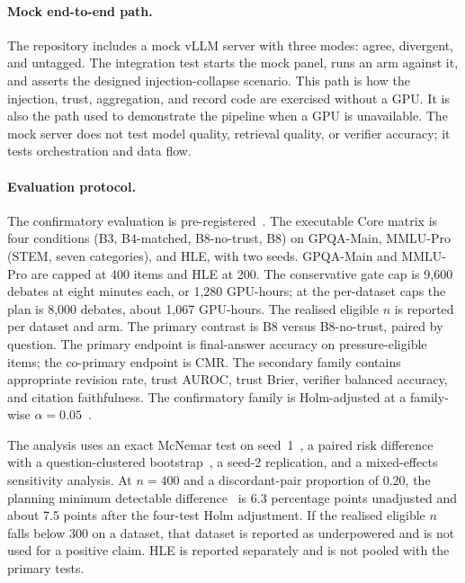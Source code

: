 \paragraph*{Mock end-to-end path.}
The repository includes a mock vLLM server with three modes: agree, divergent, and untagged. The integration test starts the mock panel, runs an arm against it, and asserts the designed injection-collapse scenario. This path is how the injection, trust, aggregation, and record code are exercised without a GPU. It is also the path used to demonstrate the pipeline when a GPU is unavailable. The mock server does not test model quality, retrieval quality, or verifier accuracy; it tests orchestration and data flow.

\paragraph*{Evaluation protocol.}
The confirmatory evaluation is pre-registered~\cite{nosek2018preregistration}. The executable Core matrix is four conditions (B3, B4-matched, B8-no-trust, B8) on GPQA-Main, MMLU-Pro (STEM, seven categories), and HLE, with two seeds. GPQA-Main and MMLU-Pro are capped at 400 items and HLE at 200. The conservative gate cap is 9{,}600 debates at eight minutes each, or 1{,}280 GPU-hours; at the per-dataset caps the plan is 8{,}000 debates, about 1{,}067 GPU-hours. The realised eligible $n$ is reported per dataset and arm. The primary contrast is B8 versus B8-no-trust, paired by question. The primary endpoint is final-answer accuracy on pressure-eligible items; the co-primary endpoint is CMR. The secondary family contains appropriate revision rate, trust AUROC, trust Brier, verifier balanced accuracy, and citation faithfulness. The confirmatory family is Holm-adjusted at a family-wise $\alpha=0.05$~\cite{holm1979simple}.

The analysis uses an exact McNemar test on seed~1~\cite{mcnemar1947note}, a paired risk difference with a question-clustered bootstrap~\cite{efron1993introduction,koehn2004statistical}, a seed-2 replication, and a mixed-effects sensitivity analysis. At $n=400$ and a discordant-pair proportion of 0.20, the planning minimum detectable difference~\cite{card2020little} is 6.3 percentage points unadjusted and about 7.5 points after the four-test Holm adjustment. If the realised eligible $n$ falls below 300 on a dataset, that dataset is reported as underpowered and is not used for a positive claim. HLE is reported separately and is not pooled with the primary tests.

